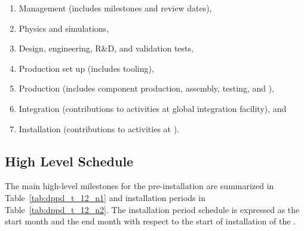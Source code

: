 \begin{enumerate}
\item Management \dual {} (includes milestones and review dates),
\item Physics and simulations,
\item Design, engineering, R\&D, and validation tests,
\item Production set up (includes tooling),
\item Production (includes component production, assembly, testing, and ),
\item Integration (contributions to activities at global integration facility), and
\item Installation (contributions to activities at \surf).

\end{enumerate}

\subsection{High Level Schedule}


The main high-level milestones for the pre-installation are summarized in Table~\ref{tab:dppd_t_12_n1} and installation periods in  Table~\ref{tab:dppd_t_12_n2}. The installation period schedule is expressed as the start month and the end month with respect to the start of installation of the \dune \dual.

